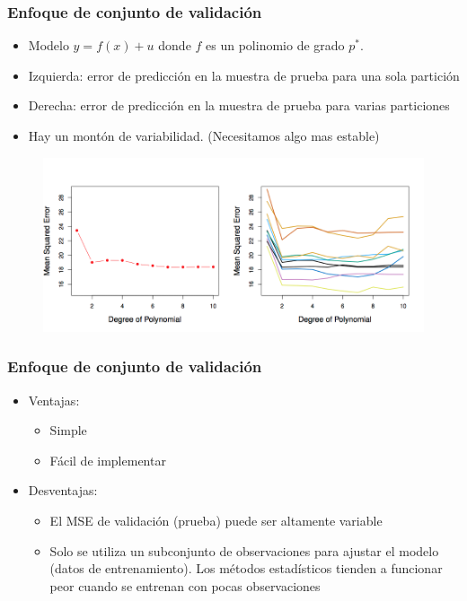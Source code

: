 \documentclass[
  shownotes,
  xcolor={svgnames},
  hyperref={colorlinks,citecolor=DarkBlue,linkcolor=DarkRed,urlcolor=DarkBlue}
  , aspectratio=169]{beamer}
\begin{document}
\begin{frame}[fragile]
\frametitle{Enfoque de conjunto de validación}
\begin{itemize}
\item Modelo $y=f(x) +u$ donde $f$ es un polinomio de grado $p^*$. 
\scriptsize
\item Izquierda: error de predicción en la muestra de prueba para una sola partición
\item Derecha: error de predicción en la muestra de prueba para varias particiones
\item  Hay un montón de variabilidad. (Necesitamos algo mas estable)
\end{itemize}


 \begin{figure}[H] \centering
            \captionsetup{justification=centering}
              \includegraphics[scale=0.7]{figures/fig52.png}
       \end{figure}
\end{frame}
\begin{frame}[fragile]
\frametitle{Enfoque de conjunto de validación}

\begin{itemize}
  \item Ventajas:
  \medskip
    \begin{itemize}
      \item Simple
      \medskip
      \item Fácil de implementar
      \medskip
    \end{itemize}
  \item Desventajas:
  \medskip
    \begin{itemize}
      \item El MSE de validación (prueba) puede ser altamente variable
      \medskip
      \item  Solo se utiliza un subconjunto de observaciones para ajustar el modelo (datos de entrenamiento). Los métodos estadísticos tienden a funcionar peor cuando se entrenan con pocas observaciones
\end{itemize}
\end{itemize}

\end{frame}
\end{document}
